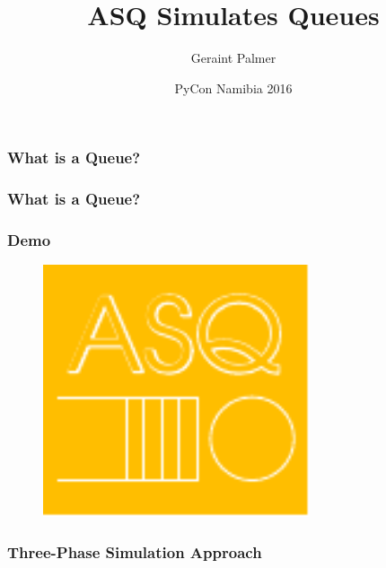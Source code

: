\documentclass{beamer}
\title
{ASQ Simulates Queues}
\author{Geraint Palmer}
\date{PyCon Namibia 2016}
\begin{document}
\frame{\titlepage}

\begin{frame}
\frametitle{What is a Queue?}
\begin{figure}
  
\end{figure}
\end{frame}

\begin{frame}
\frametitle{What is a Queue?}
\begin{figure}
  
\end{figure}
\end{frame}

\begin{frame}
\begin{figure}
    
\end{figure}
\end{frame}

\begin{frame}
\frametitle{Demo}
\begin{figure}
    \includegraphics[width=0.7\textwidth]{asq_logo}
\end{figure}
\end{frame}

\begin{frame}
\begin{figure}
    
\end{figure}
\end{frame}

\begin{frame}
\frametitle{Three-Phase Simulation Approach}
\begin{figure}
    
\end{figure}
\end{frame}
\end{document}
